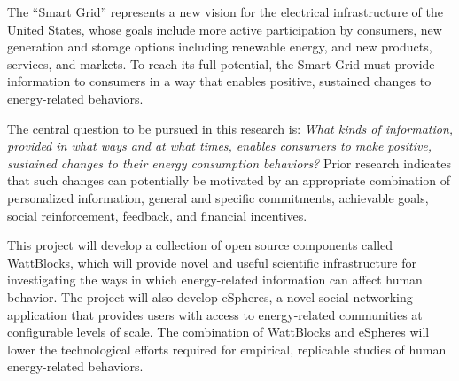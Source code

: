 



  The ``Smart Grid'' represents a new vision for
the electrical infrastructure of the United States, whose goals include
more active participation by consumers, new generation and storage options
including renewable energy, and new products, services, and markets.  To
reach its full potential, the Smart Grid must provide information to
consumers in a way that enables positive, sustained changes to
energy-related behaviors.  

The central question to be pursued in this research is: {\em What kinds of
  information, provided in what ways and at what times, enables consumers
  to make positive, sustained changes to their energy consumption
  behaviors?}  Prior research indicates that such changes can potentially
be motivated by an appropriate combination of personalized information,
general and specific commitments, achievable goals, social reinforcement,
feedback, and financial incentives.

\medskip

 This project will develop a collection
of open source components called WattBlocks, which  will provide novel and
useful scientific infrastructure for investigating the ways in which
energy-related information can affect human behavior. The project will also
develop eSpheres, a novel social networking application that provides users
with access to energy-related communities at configurable levels of
scale. The combination of WattBlocks and eSpheres will lower the technological 
efforts required for empirical, replicable studies of human energy-related
behaviors.    

